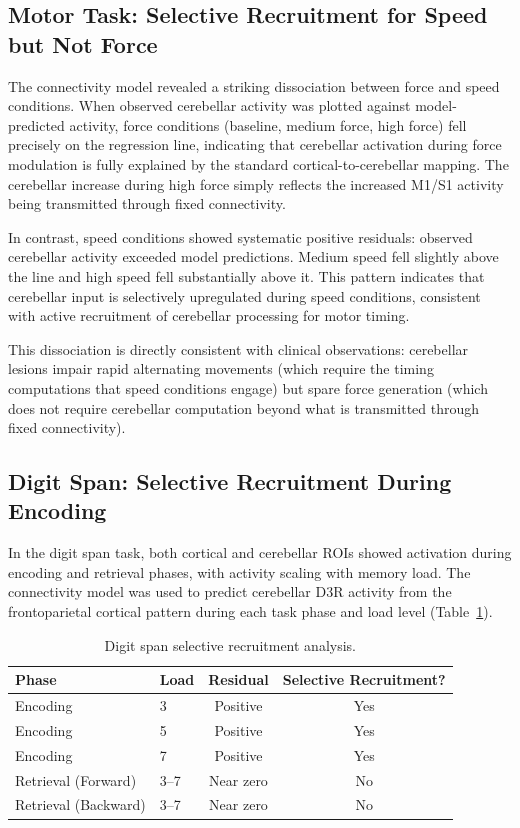 \documentclass[11pt]{article}
\begin{document}
\subsection{Motor Task: Selective Recruitment for Speed but Not Force}

The connectivity model revealed a striking dissociation between force and speed conditions. When observed cerebellar activity was plotted against model-predicted activity, force conditions (baseline, medium force, high force) fell precisely on the regression line, indicating that cerebellar activation during force modulation is fully explained by the standard cortical-to-cerebellar mapping. The cerebellar increase during high force simply reflects the increased M1/S1 activity being transmitted through fixed connectivity.

In contrast, speed conditions showed systematic positive residuals: observed cerebellar activity exceeded model predictions. Medium speed fell slightly above the line and high speed fell substantially above it. This pattern indicates that cerebellar input is selectively upregulated during speed conditions, consistent with active recruitment of cerebellar processing for motor timing.

This dissociation is directly consistent with clinical observations: cerebellar lesions impair rapid alternating movements (which require the timing computations that speed conditions engage) but spare force generation (which does not require cerebellar computation beyond what is transmitted through fixed connectivity).

\subsection{Digit Span: Selective Recruitment During Encoding}

In the digit span task, both cortical and cerebellar ROIs showed activation during encoding and retrieval phases, with activity scaling with memory load. The connectivity model was used to predict cerebellar D3R activity from the frontoparietal cortical pattern during each task phase and load level (Table~\ref{tab:wm}).

\begin{table}[h]
\centering
\caption{Digit span selective recruitment analysis.}
\label{tab:wm}
\begin{tabular}{llcc}
\toprule
Phase & Load & Residual & Selective Recruitment? \\
\midrule
Encoding & 3 & Positive & Yes \\
Encoding & 5 & Positive & Yes \\
Encoding & 7 & Positive & Yes \\
Retrieval (Forward) & 3--7 & Near zero & No \\
Retrieval (Backward) & 3--7 & Near zero & No \\
\bottomrule
\end{tabular}
\end{table}
\end{document}
